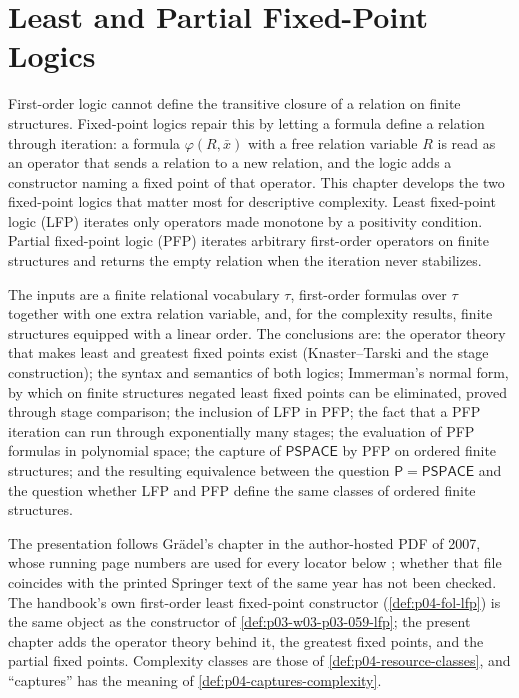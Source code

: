 \chapter{Least and Partial Fixed-Point Logics}
\label{sec:p03-w03-p03-059-fixed-point-logics}

First-order logic cannot define the transitive closure of a relation on
finite structures. Fixed-point logics repair this by letting a formula
define a relation through iteration: a formula \(\varphi(R,\bar x)\) with a
free relation variable \(R\) is read as an operator that sends a relation to
a new relation, and the logic adds a constructor naming a fixed point of
that operator. This chapter develops the two fixed-point logics that matter
most for descriptive complexity. Least fixed-point logic (LFP) iterates only
operators made monotone by a positivity condition. Partial fixed-point logic
(PFP) iterates arbitrary first-order operators on finite structures and
returns the empty relation when the iteration never stabilizes.

The inputs are a finite relational vocabulary \(\tau\), first-order
formulas over \(\tau\) together with one extra relation variable, and, for
the complexity results, finite structures equipped with a linear order. The
conclusions are: the operator theory that makes least and greatest fixed
points exist (Knaster--Tarski and the stage construction); the syntax and
semantics of both logics; Immerman's normal form, by which on finite
structures negated least fixed points can be eliminated, proved through
stage comparison; the inclusion of LFP in PFP; the fact that a PFP
iteration can run through exponentially many stages; the evaluation of PFP
formulas in polynomial space; the capture of \(\mathsf{PSPACE}\) by PFP on
ordered finite structures; and the resulting equivalence between the
question \(\mathsf P=\mathsf{PSPACE}\) and the question whether LFP and PFP
define the same classes of ordered finite structures.

The presentation follows Gr\"adel's chapter in the author-hosted PDF of
2007, whose running page numbers are used for every locator below
\cite[pp.~152--180]{Gradel2007FMTDescriptiveChapter}; whether that file coincides with the
printed Springer text of the same year has not been checked. The handbook's
own first-order least fixed-point constructor
(\cref{def:p04-fol-lfp}) is the same object as the constructor of
\cref{def:p03-w03-p03-059-lfp}; the present chapter adds the operator
theory behind it, the greatest fixed points, and the partial fixed points.
Complexity classes are those of \cref{def:p04-resource-classes}, and
``captures'' has the meaning of \cref{def:p04-captures-complexity}.

